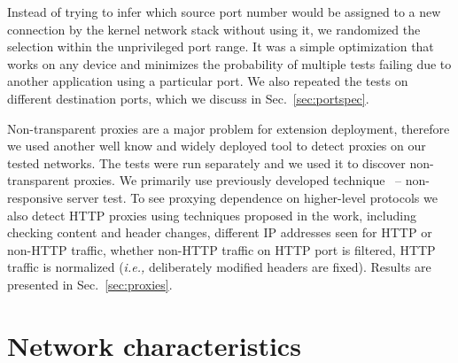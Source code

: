 \documentclass{sig-alternate-10pt}
\providecommand{\ie}{\emph{i.e.,} }
\begin{document}
Instead of trying to infer which source port number would be assigned to a new connection by the kernel network stack without using it, we randomized the selection within the unprivileged port range. It was a simple optimization that works on any device and minimizes the probability of multiple tests failing due to another application using a particular port. We also repeated the tests on different destination ports, which we discuss in Sec.~\ref{sec:portspec}.

Non-transparent proxies are a major problem for extension deployment, therefore we used another well know and widely deployed tool to detect proxies on our tested networks. The tests were run separately and we used it to discover non-transparent proxies. We primarily use previously developed technique~\cite{Weaver:RHwbx82O} --  non-responsive server test. To see proxying dependence on higher-level protocols we also detect HTTP proxies using techniques proposed in the work, including checking content and header changes, different IP addresses seen for HTTP or non-HTTP traffic, whether non-HTTP traffic on HTTP port is filtered, HTTP traffic is normalized (\ie deliberately modified headers are fixed). Results are presented in Sec.~\ref{sec:proxies}.

\section{Network characteristics}
\label{sec:network}
\end{document}
